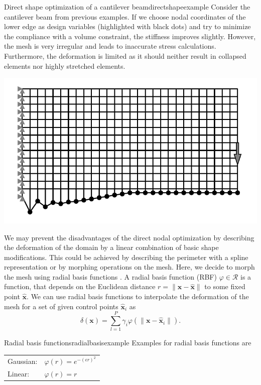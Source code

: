 \begin{example}{Direct shape optimization of a cantilever beam}{directshapeexample}   
    Consider the cantilever beam from previous examples. If we choose nodal coordinates of the lower edge as design variables (highlighted with black dots) and try to minimize the compliance with a volume constraint, the stiffness improves slightly. However, the mesh is very irregular and leads to inaccurate stress calculations. Furthermore, the deformation is limited as it should neither result in collapsed elements nor highly stretched elements. 
    \begin{center}
        \includegraphics[width=0.9\linewidth]{figures/cantilever_fem_naive_shape.pdf}
    \end{center}
\end{example}

We may prevent the disadvantages of the direct nodal optimization by describing the deformation of the domain by a linear combination of basic shape modifications. This could be achieved by describing the perimeter with a spline representation \cite{Christensen2008} or by morphing operations on the mesh. Here, we decide to morph the mesh using radial basis functions \cite{Biancolini20}. 
A radial basis function (RBF) $\varphi \in \mathcal{R}$ is a function, that depends on the Euclidean distance $r = \lVert \mathbf{x}-\hat{\mathbf{x}} \rVert$ to some fixed point $\hat{\mathbf{x}}$.
We can use radial basis functions to interpolate the deformation of the mesh for a set of given control points $\hat{\mathbf{x}}_i$ as 
\begin{equation}
    \delta(\mathbf{x}) = \sum_{l=1}^P \gamma_i \varphi(\lVert \mathbf{x}-\hat{\mathbf{x}}_i \rVert).
\end{equation}

\begin{example}{Radial basis functions}{radialbasisexample}   
    Examples for radial basis functions are
    \begin{center}
        \begin{tabular}{ll}
            Gaussian: & $\varphi(r) = e^{-(\epsilon r)^2}$ \\
            Linear: & $\varphi(r) = r$ \\
        \end{tabular}
    \end{center}
\end{example}

